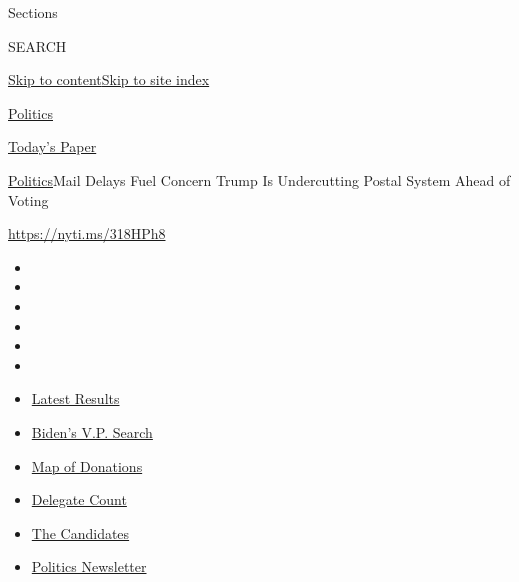 Sections

SEARCH

\protect\hyperlink{site-content}{Skip to
content}\protect\hyperlink{site-index}{Skip to site index}

\href{https://www.nytimes.com/section/politics}{Politics}

\href{https://myaccount.nytimes.com/auth/login?response_type=cookie\&client_id=vi}{}

\href{https://www.nytimes.com/section/todayspaper}{Today's Paper}

\href{/section/politics}{Politics}\textbar{}Mail Delays Fuel Concern
Trump Is Undercutting Postal System Ahead of Voting

\url{https://nyti.ms/318HPh8}

\begin{itemize}
\item
\item
\item
\item
\item
\item
\end{itemize}

\begin{itemize}
\item
  \href{https://www.nytimes.com/interactive/2020/08/04/us/elections/results-arizona-kansas-michigan-missouri-primaries.html?action=click\&pgtype=Article\&state=default\&region=TOP_BANNER\&context=storylines_menu}{Latest
  Results}
\item
  \href{https://www.nytimes.com/article/biden-vice-president-2020.html?action=click\&pgtype=Article\&state=default\&region=TOP_BANNER\&context=storylines_menu}{Biden's
  V.P. Search}
\item
  \href{https://www.nytimes.com/interactive/2020/07/24/us/politics/trump-biden-campaign-donors.html?action=click\&pgtype=Article\&state=default\&region=TOP_BANNER\&context=storylines_menu}{Map
  of Donations}
\item
  \href{https://www.nytimes.com/interactive/2020/us/elections/delegate-count-primary-results.html?action=click\&pgtype=Article\&state=default\&region=TOP_BANNER\&context=storylines_menu}{Delegate
  Count}
\item
  \href{https://www.nytimes.com/interactive/2019/us/politics/2020-presidential-candidates.html?action=click\&pgtype=Article\&state=default\&region=TOP_BANNER\&context=storylines_menu}{The
  Candidates}
\item
  \href{https://www.nytimes.com/newsletters/politics?action=click\&pgtype=Article\&state=default\&region=TOP_BANNER\&context=storylines_menu}{Politics
  Newsletter}
\end{itemize}

